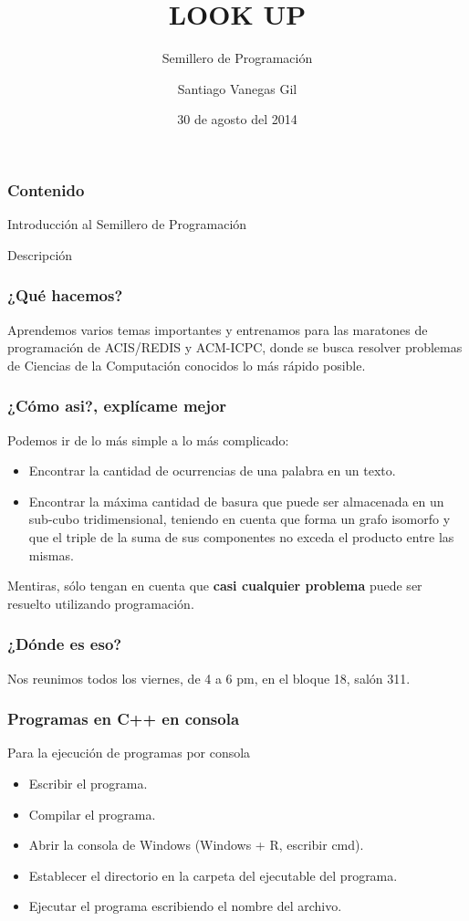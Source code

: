 \documentclass{beamer}
\title{LOOK UP}
\subtitle{Semillero de Programación}
\author{Santiago Vanegas Gil}
\institute{Universidad EAFIT}
\date{30 de agosto del 2014}
\begin{document}
\begin{frame}
	\titlepage
\end{frame}

\begin{frame}
	\frametitle{Contenido}
	\tableofcontents
\end{frame}

\begin{section}{Introducción al Semillero de Programación}
	\begin{subsection}{Descripción}
		\begin{frame}[fragile]
			\frametitle{¿Qué hacemos?}
			Aprendemos varios temas importantes y entrenamos para las maratones de programación de ACIS/REDIS y ACM-ICPC, donde se busca resolver problemas de Ciencias de la Computación conocidos lo más rápido posible.
		\end{frame}
		\begin{frame}[fragile]
			\frametitle{¿Cómo asi?, explícame mejor}
			Podemos ir de lo más simple a lo más complicado:
			\begin{itemize}
				\item Encontrar la cantidad de ocurrencias de una palabra en un texto.
				\item Encontrar la máxima cantidad de basura que puede ser almacenada en un sub-cubo tridimensional, teniendo en cuenta que forma un grafo isomorfo y que el triple de la suma de sus componentes no exceda el producto entre las mismas.
			\end{itemize}
			\pause
			Mentiras, sólo tengan en cuenta que \textbf{casi cualquier problema} puede ser resuelto utilizando programación.
		\end{frame}
		\begin{frame}[fragile]
			\frametitle{¿Dónde es eso?}
			Nos reunimos todos los viernes, de 4 a 6 pm, en el bloque 18, salón 311.
		\end{frame}
	\end{subsection}
	
\end{section}

\begin{frame}[fragile]
	\frametitle{Programas en C++ en consola}
	Para la ejecución de programas por consola
	\begin{itemize}
		\item Escribir el programa.
		\pause
		\item Compilar el programa.
		\pause
		\item Abrir la consola de Windows (Windows + R, escribir cmd).
		\pause
		\item Establecer el directorio en la carpeta del ejecutable del programa.
		\pause
		\item Ejecutar el programa escribiendo el nombre del archivo.
	\end{itemize}
\end{frame}
\end{document}
